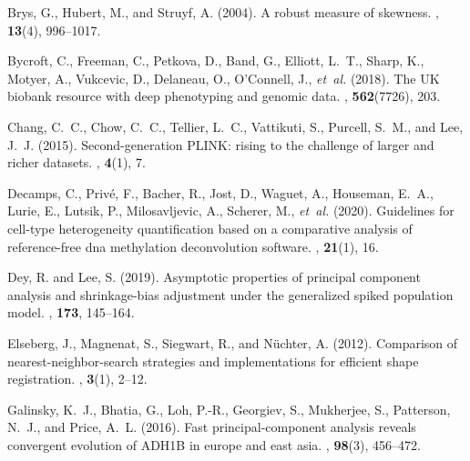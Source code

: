\documentclass{bioinfo}
\begin{document}
\begin{thebibliography}{}
	Brys, G., Hubert, M., and Struyf, A. (2004).
	\newblock A robust measure of skewness.
	, {\bf
		13}(4), 996--1017.
	
	Bycroft, C., Freeman, C., Petkova, D., Band, G., Elliott, L.~T., Sharp, K.,
	Motyer, A., Vukcevic, D., Delaneau, O., O'Connell, J., {\em et~al.} (2018).
	\newblock The {UK} biobank resource with deep phenotyping and genomic data.
	, {\bf 562}(7726), 203.
	
	Chang, C.~C., Chow, C.~C., Tellier, L.~C., Vattikuti, S., Purcell, S.~M., and
	Lee, J.~J. (2015).
	\newblock Second-generation {PLINK}: rising to the challenge of larger and
	richer datasets.
	, {\bf 4}(1), 7.
	
	Decamps, C., Priv{\'e}, F., Bacher, R., Jost, D., Waguet, A., Houseman, E.~A.,
	Lurie, E., Lutsik, P., Milosavljevic, A., Scherer, M., {\em et~al.} (2020).
	\newblock Guidelines for cell-type heterogeneity quantification based on a
	comparative analysis of reference-free dna methylation deconvolution
	software.
	, {\bf 21}(1), 16.
	
	Dey, R. and Lee, S. (2019).
	\newblock Asymptotic properties of principal component analysis and
	shrinkage-bias adjustment under the generalized spiked population model.
	, {\bf 173}, 145--164.
	
	Elseberg, J., Magnenat, S., Siegwart, R., and N{\"u}chter, A. (2012).
	\newblock Comparison of nearest-neighbor-search strategies and implementations
	for efficient shape registration.
	, {\bf 3}(1),
	2--12.
	
	Galinsky, K.~J., Bhatia, G., Loh, P.-R., Georgiev, S., Mukherjee, S.,
	Patterson, N.~J., and Price, A.~L. (2016).
	\newblock Fast principal-component analysis reveals convergent evolution of
	{ADH1B} in europe and east asia.
	, {\bf 98}(3),
	456--472.
	

\end{thebibliography}
\end{document}
